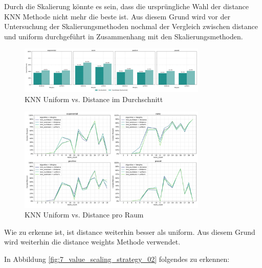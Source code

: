 Durch die Skalierung könnte es sein, dass die ursprüngliche Wahl der distance KNN Methode nicht mehr die beste ist. Aus diesem Grund wird vor der Untersuchung der Skalierungsmethoden nochmal der Vergleich zwischen distance und uniform durchgeführt in Zusammenhang mit den Skalierungsmethoden.

\begin{figure}[H]
    \centering
    \includegraphics[width=0.8\textwidth]{images/7_value_scaling_strategy_knn_distance_02.png}
    \caption{KNN Uniform vs. Distance im Durchschnitt}
    \label{fig:7_value_scaling_strategy_knn_distance_02}
\end{figure}

\begin{figure}[H]
    \centering
    \includegraphics[width=0.8\textwidth]{images/7_value_scaling_strategy_knn_distance_03.png}
    \caption{KNN Uniform vs. Distance pro Raum}
    \label{fig:7_value_scaling_strategy_knn_distance_03}
\end{figure}

Wie zu erkenne ist, ist distance weiterhin besser als uniform. Aus diesem Grund wird weiterhin die distance weights Methode verwendet.

In Abbildung \ref{fig:7_value_scaling_strategy_02} folgendes zu erkennen:

